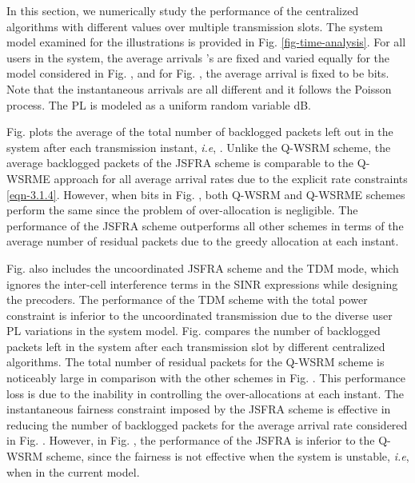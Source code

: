 In this section, we numerically study the performance of the centralized algorithms with different  values over multiple transmission slots. The system model examined for the illustrations is provided in Fig. \ref{fig-time-analysis}. For all users in the system, the average arrivals 's are fixed and varied equally for the model considered in Fig. , and for Fig. , the average arrival is fixed to be  bits. Note that the instantaneous arrivals  are all different and it follows the Poisson process. The \ac{PL} is modeled as a uniform random variable \me{[0,-6]} dB.

Fig.  plots the average of the total number of backlogged packets left out in the system after each transmission instant, \textit{i.e}, . Unlike the \ac{Q-WSRM} scheme, the average backlogged packets of the  \ac{JSFRA} scheme is comparable to the \ac{Q-WSRME} approach for all average arrival rates due to the explicit rate constraints \eqref{eqn-3.1.4}. However, when  bits in Fig. , both \ac{Q-WSRM} and \ac{Q-WSRME} schemes perform the same since the problem of over-allocation is negligible. The performance of the  \ac{JSFRA} scheme outperforms all other schemes in terms of the average number of residual packets due to the greedy allocation at each instant. 

Fig.  also includes the uncoordinated  \ac{JSFRA} scheme and the \ac{TDM} mode, which ignores the inter-cell interference terms in the \ac{SINR} expressions while designing the precoders. The performance of the \ac{TDM} scheme with the total power constraint is inferior to the uncoordinated transmission due to the diverse user \ac{PL} variations in the system model. Fig.  compares the number of backlogged packets left in the system after each transmission slot by different centralized algorithms. The total number of residual packets for the \ac{Q-WSRM} scheme is noticeably large in comparison with the other schemes in Fig. . This performance loss is due to the inability in controlling the over-allocations at each instant. The instantaneous fairness constraint imposed by the \me{\ell_\infty} \ac{JSFRA} scheme is effective in reducing the number of backlogged packets for the average arrival rate considered in Fig. . However, in Fig. , the performance of the \me{\ell_\infty} \ac{JSFRA} is inferior to the \ac{Q-WSRM} scheme, since the fairness is not effective when the system is unstable, \textit{i.e}, when  in the current model.
